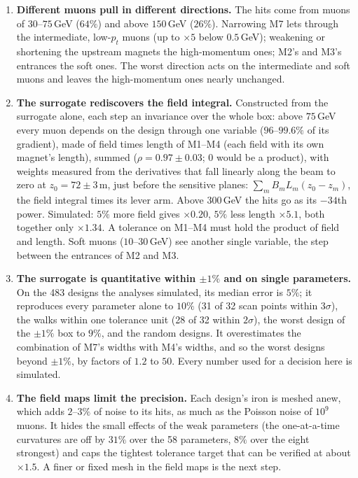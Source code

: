 \documentclass[11pt,a4paper]{article}
\begin{document}
\begin{enumerate}
        $\pm2\%$ keep the hits within about $\pm20\%$; at $\pm5\%$ most designs stay within
        $\pm50\%$, with a tail to $\times1.8$--$3.8$; at $\pm10\%$ the median design is more than
        twice as bad and the tail reaches $\times16$ among eight simulated designs. A
        specification can therefore be much looser if the errors are independent than if it
        must hold against the worst combination.
  \item \textbf{Different muons pull in different directions.} The hits come from muons of
        $30$--$75$\,GeV ($64\%$) and above $150$\,GeV ($26\%$). Narrowing M7 lets through the
        intermediate, low-$p_t$ muons (up to $\times5$ below $0.5$\,GeV); weakening or shortening
        the upstream magnets the high-momentum ones; M2's and M3's entrances the soft ones. The
        worst direction acts on the intermediate and soft muons and leaves the high-momentum ones
        nearly unchanged.
  \item \textbf{The surrogate rediscovers the field integral.} Constructed from the surrogate
        alone, each step an invariance over the whole box: above $75$\,GeV every muon depends on
        the design through one variable ($96$--$99.6\%$ of its gradient), made of field times
        length of M1--M4 (each field with its own magnet's length), summed ($\rho=0.97\pm0.03$;
        $0$ would be a product), with weights measured from the derivatives that fall linearly
        along the beam to zero at $z_0=72\pm3$\,m, just before the sensitive planes:
        $\sum_mB_mL_m(z_0-z_m)$, the field integral times its lever arm. Above
        $300$\,GeV the hits go as its $-34$th power. Simulated: $5\%$ more field gives
        $\times0.20$, $5\%$ less length $\times5.1$, both together only $\times1.34$. A tolerance
        on M1--M4 must hold the product of field and length. Soft muons ($10$--$30$\,GeV) see
        another single variable, the step between the entrances of M2 and M3.
  \item \textbf{The surrogate is quantitative within $\pm1\%$ and on single parameters.} On the
        483 designs the analyses simulated, its median error is $5\%$; it reproduces every
        parameter alone to $10\%$ (31 of 32 scan points within $3\sigma$), the walks within one
        tolerance unit (28 of 32 within $2\sigma$), the worst design of the $\pm1\%$ box to
        $9\%$, and the random designs. It overestimates the combination of M7's widths with
        M4's widths, and so the worst designs beyond $\pm1\%$, by factors of $1.2$ to $50$.
        Every number used for a decision here is simulated.
  \item \textbf{The field maps limit the precision.} Each design's iron is meshed anew, which adds
        $2$--$3\%$ of noise to its hits, as much as the Poisson noise of $10^9$ muons. It hides the
        small effects of the weak parameters (the one-at-a-time curvatures are off by $31\%$ over
        the 58 parameters, $8\%$ over the eight strongest) and caps the tightest tolerance target
        that can be verified at about $\times1.5$. A finer or fixed mesh in the field maps is the
        next step.
\end{enumerate}
\end{document}
